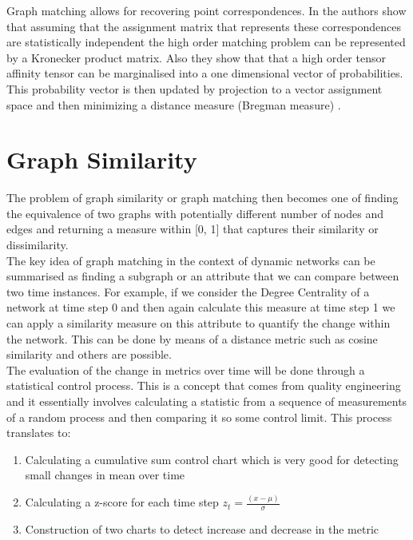 Graph matching allows for recovering point correspondences. In \citeauthor{Zass2008}\cite{Zass2008} the authors show that assuming that the assignment matrix that represents these correspondences are statistically independent the high order matching problem can be represented by a Kronecker product matrix. Also they show that that a high order tensor affinity tensor can be marginalised into a one dimensional vector of probabilities. This probability vector is then updated by projection to a vector assignment space and then minimizing a distance measure (Bregman measure) \cite{Egozi2013}.

\section{Graph Similarity}

The problem of graph similarity or graph matching then becomes one of finding the equivalence of two graphs with potentially different number of nodes and edges and returning a measure within [0, 1] that captures their similarity or dissimilarity. \cite{Hanneman2005,McDiarmid2013,Ashby2007,Zass2008,Dehmer2006,Komosinski2011,Koutra2011,Rawashdeh2012,Soundarajan2014,Zager2008}\\

The key idea of graph matching in the context of dynamic networks can be summarised as finding a subgraph or an attribute that we can compare between two time instances. For example, if we consider the Degree Centrality of a network at time step 0 and then again calculate this measure at time step 1 we can apply a similarity measure on this attribute to quantify the change within the network. This can be done by means of a distance metric such as cosine similarity and others are possible. \\

The evaluation of the change in metrics over time will be done through a statistical control process. This is a concept that comes from quality engineering and it essentially involves calculating a statistic from a sequence of measurements of a random process and then comparing it so some control limit. This process translates to:

\begin{enumerate}
    \item Calculating a cumulative sum control chart which is very good for detecting small changes in mean over time
    \item Calculating a z-score for each time step $z_t = \frac{(x - \mu)}{\sigma}$
    \item Construction of two charts to detect increase and decrease in the metric
\end{enumerate}


